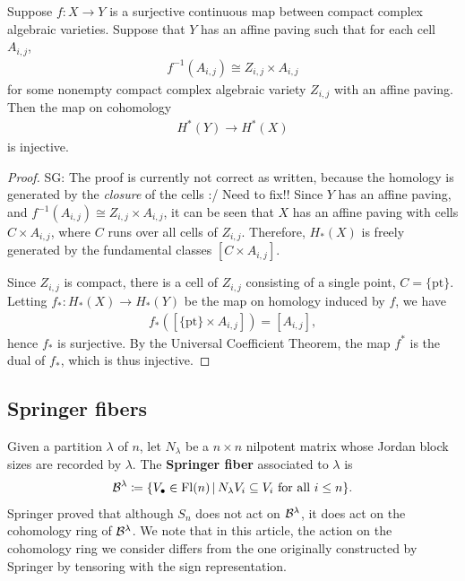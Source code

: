 \documentclass[12pt]{amsart}
\newcommand{\st}{\,|\,}
\newcommand{\Fl}{\mathrm{Fl}}
\newcommand{\SG}[1]{{\color{red} SG: #1}}
\begin{document}
\begin{lemma}\label{lem:InjectiveCoh}
Suppose $f: X\to Y$ is a surjective continuous map between compact complex algebraic varieties. Suppose that $Y$ has an affine paving such that for each cell $A_{i,j}$,
\begin{align}
    f^{-1}(A_{i,j}) \cong Z_{i,j}\times A_{i,j}
\end{align}
for some nonempty compact complex algebraic variety $Z_{i,j}$ with an affine paving. Then the map on cohomology
\begin{align}
    H^*(Y)\to H^*(X)
\end{align}
is injective.
\end{lemma}

\begin{proof}
\SG{The proof is currently not correct as written, because the homology is generated by the \emph{closure} of the cells :/ Need to fix!!} Since $Y$ has an affine paving, and $f^{-1}(A_{i,j})\cong Z_{i,j} \times A_{i,j}$, it can be seen that $X$ has an affine paving with cells $C\times A_{i,j}$, where $C$ runs over all cells of $Z_{i,j}$. 
 Therefore, $H_*(X)$ is freely generated by the fundamental classes $[C\times A_{i,j}]$. 

Since $Z_{i,j}$ is compact, there is a cell of $Z_{i,j}$ consisting of a single point, $C = \{\text{pt}\}$. Letting $f_* : H_*(X)\to H_*(Y)$ be the map on homology induced by $f$, we have
\begin{align}
f_*([\{\text{pt}\}\times A_{i,j}]) = [A_{i,j}],
\end{align}
hence $f_*$ is surjective. 
By the Universal Coefficient Theorem, the map $f^*$ is the dual of $f_*$, which is thus injective.
\end{proof}

\subsection{Springer fibers}

Given a partition $\lambda$ of $n$, let $N_\lambda$ be a $n\times n$ nilpotent matrix whose Jordan block sizes are recorded by $\lambda$. The {\bf Springer fiber} associated to $\lambda$ is
\begin{align}
    \cB^\lambda \coloneqq \{V_\bullet \in \Fl(n) \st N_\lambda V_i\subseteq V_i \text{ for all } i\leq n\}.
\end{align}
Springer proved that although $S_n$ does not act on $\mathcal{B}^\lambda$, it does act on the cohomology ring of $\mathcal{B}^\lambda$. We note that in this article, the action on the cohomology ring we consider differs from the one originally constructed by Springer by tensoring with the sign representation.
\end{document}
